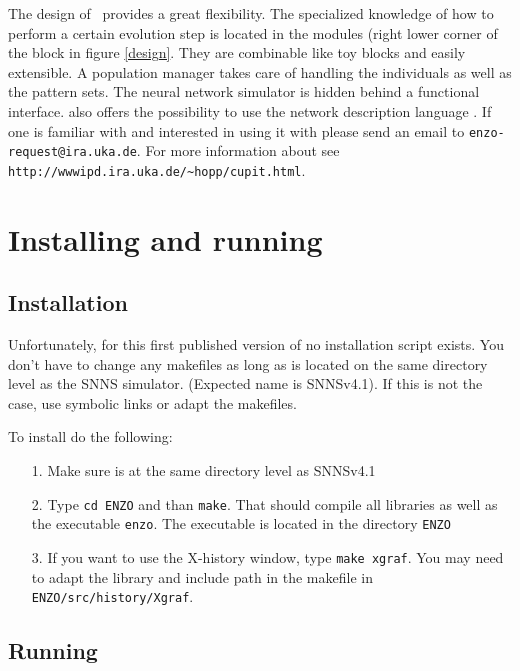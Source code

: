 The design of  \ENZO\ provides a great flexibility.  The specialized knowledge
of how to perform a certain evolution step is located in the modules (right lower corner
of the \ENZO block in figure \ref{design}. They are combinable like toy blocks
and easily extensible. A population manager takes care of handling the individuals
as well as the pattern sets. The neural network simulator is hidden behind a
functional interface. \ENZO also offers the possibility to use the network description
language \CuPit. If one is familiar with \CuPit and interested  in using it
with \ENZO please send an email to \verb+enzo-request@ira.uka.de+.
For more information about \CuPit see \verb+http://wwwipd.ira.uka.de/~hopp/cupit.html+.


\section{Installing and running \ENZO }

\subsection{Installation}

Unfortunately, for this first published version of \ENZO no installation
script exists. You don't have to change any makefiles as
long as \ENZO is located on the same directory level as
the SNNS simulator. (Expected name is SNNSv4.1).
If this is not the  case, use symbolic links or adapt the makefiles.

To install \ENZO do the following:
\begin{itemize}
\item[1.]{Make sure \ENZO is at the same directory level as SNNSv4.1}

\item[2.]{Type \verb+cd ENZO+ and than \verb+make+. That should compile all libraries
	as well as the executable \verb+enzo+. The executable is located in the directory
	\verb+ENZO+ }

\item[3.]{If you want to use the X-history window, type \verb+make xgraf+.
	You may need to adapt the library and include path in the makefile
	in \verb+ENZO/src/history/Xgraf+.}

\end{itemize}



\subsection{Running \ENZO }

